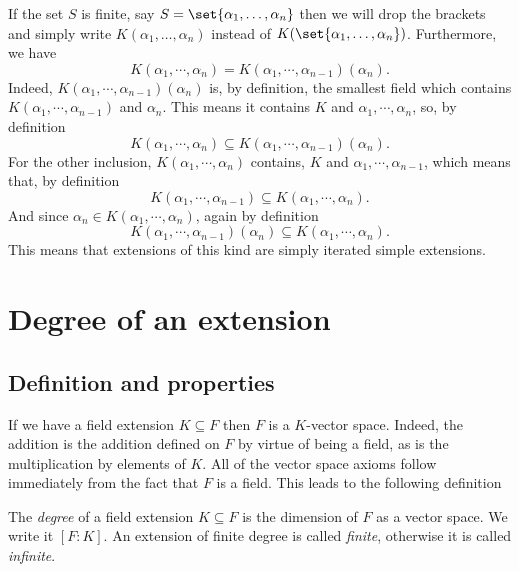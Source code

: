 \documentclass[12pt,oneside]{book}
\begin{document}
If the set \( S \) is finite, say \( S = \set{\alpha_1, \dots, \alpha_n} \) then we will
drop the brackets and simply write \( K(\alpha_1, \dots, \alpha_n) \) instead of \(
K(\set{\alpha_1, \dots, \alpha_n}) \). Furthermore, we have
\begin{equation*}
	K(\alpha_1, \cdots, \alpha_n) = K(\alpha_1, \cdots, \alpha_{n-1})(\alpha_n).
\end{equation*}
Indeed, \( K(\alpha_1, \cdots, \alpha_{n-1})(\alpha_n) \) is, by definition, the smallest
field which contains \( K(\alpha_1, \cdots, \alpha_{n-1}) \) and \( \alpha_n \). This
means it contains \( K \) and \( \alpha_1, \cdots, \alpha_n \), so, by definition
\begin{equation*}
	K(\alpha_1, \cdots, \alpha_n) \subseteq K(\alpha_1, \cdots, \alpha_{n-1})(\alpha_n).
\end{equation*}
For the other inclusion, \( K(\alpha_1, \cdots, \alpha_n) \) contains, \( K
\) and \( \alpha_1, \cdots, \alpha_{n-1} \), which means that, by definition
\begin{equation*}
	K(\alpha_1, \cdots, \alpha_{n-1}) \subseteq K(\alpha_1, \cdots, \alpha_n).
\end{equation*}
And since \( \alpha_n \in K(\alpha_1, \cdots, \alpha_n) \), again by definition
\begin{equation*}
	K(\alpha_1, \cdots, \alpha_{n-1})(\alpha_n) \subseteq K(\alpha_1, \cdots, \alpha_n).
\end{equation*}
This means that extensions of this kind are simply iterated simple extensions.

\section{Degree of an extension}
\subsection{Definition and properties}
If we have a field extension \( K \subseteq F \) then \( F \) is a \( K \)-vector space.
Indeed, the addition is the addition defined on \( F \) by virtue of being a field, as is
the multiplication by elements of \( K \). All of the vector space axioms follow
immediately from the fact that \( F \) is a field. This leads to the following definition
\begin{definition}
	The \emph{degree} of a field extension \( K \subseteq F \) is the dimension of \( F \)
	as a vector space. We write it \( [F \colon K] \). An extension of finite degree is called \emph{finite}, otherwise it is called
	\emph{infinite}.
\end{definition}
\end{document}

